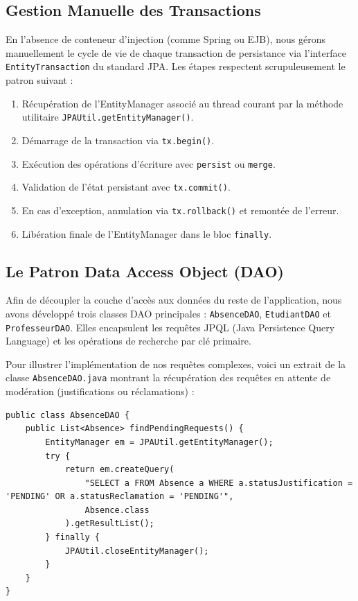 \documentclass[12pt,a4paper]{article}
\begin{document}
\subsection{Gestion Manuelle des Transactions}
En l'absence de conteneur d'injection (comme Spring ou EJB), nous gérons manuellement le cycle de vie de chaque transaction de persistance via l'interface \texttt{EntityTransaction} du standard JPA. Les étapes respectent scrupuleusement le patron suivant :
\begin{enumerate}
    \item Récupération de l'EntityManager associé au thread courant par la méthode utilitaire \texttt{JPAUtil.getEntityManager()}.
    \item Démarrage de la transaction via \texttt{tx.begin()}.
    \item Exécution des opérations d'écriture avec \texttt{persist} ou \texttt{merge}.
    \item Validation de l'état persistant avec \texttt{tx.commit()}.
    \item En cas d'exception, annulation via \texttt{tx.rollback()} et remontée de l'erreur.
    \item Libération finale de l'EntityManager dans le bloc \texttt{finally}.
\end{enumerate}

\subsection{Le Patron Data Access Object (DAO)}
Afin de découpler la couche d'accès aux données du reste de l'application, nous avons développé trois classes DAO principales : \texttt{AbsenceDAO}, \texttt{EtudiantDAO} et \texttt{ProfesseurDAO}. Elles encapsulent les requêtes JPQL (Java Persistence Query Language) et les opérations de recherche par clé primaire.

Pour illustrer l'implémentation de nos requêtes complexes, voici un extrait de la classe \texttt{AbsenceDAO.java} montrant la récupération des requêtes en attente de modération (justifications ou réclamations) :

\begin{lstlisting}[caption={Extrait des requêtes JPQL dans AbsenceDAO.java}]
public class AbsenceDAO {
    public List<Absence> findPendingRequests() {
        EntityManager em = JPAUtil.getEntityManager();
        try {
            return em.createQuery(
                "SELECT a FROM Absence a WHERE a.statusJustification = 'PENDING' OR a.statusReclamation = 'PENDING'", 
                Absence.class
            ).getResultList();
        } finally {
            JPAUtil.closeEntityManager();
        }
    }
}
\end{lstlisting}
\end{document}
